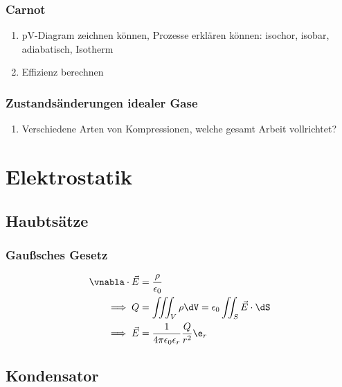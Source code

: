 \documentclass[twocolumn]{summery_3.1}
\begin{document}
\subsubsection{Carnot}
\begin{enumerate}
    \item pV-Diagram zeichnen können, Prozesse erklären können:
    isochor, isobar, adiabatisch, Isotherm
    \item Effizienz berechnen
\end{enumerate}
\subsubsection{Zustandsänderungen idealer Gase}
\begin{enumerate}
    \item Verschiedene Arten von Kompressionen, welche gesamt Arbeit vollrichtet?
\end{enumerate}

\section{Elektrostatik}
\subsection{Haubtsätze}
\subsubsection{Gaußsches Gesetz}
\begin{align*}
    \vnabla \cdot \vec E &= \frac \rho {\epsilon_0}\\
    \implies Q &= \iiint_{V} \rho \dV = \epsilon_0\iint_{S} \vec E \cdot \dS\\
    \implies \vec E &= \frac{1}{4\pi \epsilon_0 \epsilon_r} \frac{Q}{r^2}\e_r\\
\end{align*}

\subsection{Kondensator}
\end{document}
